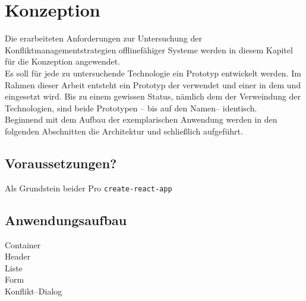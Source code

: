 \chapter{\label{chap:konzeption}Konzeption}
Die erarbeiteten Anforderungen zur Untersuchung der Konfliktmanagementstrategien offlinefähiger Systeme werden in diesem Kapitel für die Konzeption angewendet.\\
Es soll für jede zu untersuchende Technologie ein Prototyp entwickelt werden. Im Rahmen dieser Arbeit entsteht ein Prototyp der  verwendet und einer in dem  und  eingesetzt wird.  Bis zu einem gewissen Status, nämlich dem der Verweindung der Technologien, sind beide Prototypen -- bis auf den Namen-- identisch. \\
Beginnend mit dem Aufbau der exemplarischen Anwendung werden in den folgenden Abschnitten die  Architektur  und schließlich  aufgeführt.\\
%
%
\section{Voraussetzungen?}
Als Grundstein beider Pro
\tt{create-react-app}
\section{Anwendungsaufbau}
%
%
Container\\
Header\\
Liste\\
Form\\
Konflikt--Dialog\\
%
%
